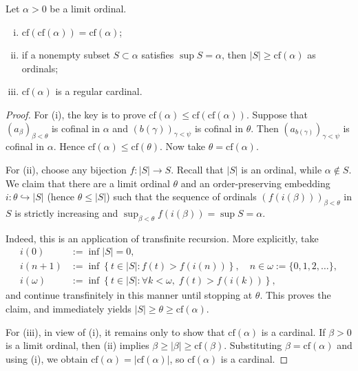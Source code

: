\begin{proposition}\label{prop:cf-generalities}
	Let $\alpha>0$ be a limit ordinal.
	\begin{enumerate}[(i)]
		\item $\mathrm{cf}(\mathrm{cf}(\alpha)) = \mathrm{cf}(\alpha)$;
		\item if a nonempty subset $S\subset\alpha$ satisfies $\sup S=\alpha$, then $|S|\geq\mathrm{cf}(\alpha)$ as ordinals;
		\item $\mathrm{cf}(\alpha)$ is a regular cardinal.
	\end{enumerate}
\end{proposition}
\begin{proof}
	For (i), the key is to prove $\mathrm{cf}(\alpha)\leq\mathrm{cf}(\mathrm{cf}(\alpha))$. Suppose that $(a_\beta)_{\beta<\theta}$ is cofinal in $\alpha$ and $(b(\gamma))_{\gamma<\psi}$ is cofinal in $\theta$. Then $\left(a_{b(\gamma)}\right)_{\gamma<\psi}$ is cofinal in $\alpha$. Hence $\mathrm{cf}(\alpha)\leq\mathrm{cf}(\theta)$. Now take $\theta=\mathrm{cf}(\alpha)$.

	For (ii), choose any bijection $f:|S|\to S$. Recall that $|S|$ is an ordinal, while $\alpha\notin S$. We claim that there are a limit ordinal $\theta$ and an order-preserving embedding $i:\theta\hookrightarrow|S|$ (hence $\theta\leq|S|$) such that the sequence of ordinals $\left(f(i(\beta))\right)_{\beta<\theta}$ in $S$ is strictly increasing and
	$\sup_{\beta<\theta}f(i(\beta))=\sup S=\alpha$.

	Indeed, this is an application of transfinite recursion. More explicitly, take
	\begin{align*}
		i(0) & := \inf |S| = 0, \\
		i(n+1) & := \inf\left\{ t \in |S|: f(t) > f(i(n)) \right\}, \quad n \in \omega := \{0, 1, 2, \ldots\}, \\
		i(\omega) & := \inf\left\{ t \in |S|: \forall k < \omega, \; f(t) > f(i(k)) \right\},
	\end{align*}
	and continue transfinitely in this manner until stopping at $\theta$. This proves the claim, and immediately yields $|S|\geq\theta\geq\mathrm{cf}(\alpha)$.

	For (iii), in view of (i), it remains only to show that $\mathrm{cf}(\alpha)$ is a cardinal. If $\beta>0$ is a limit ordinal, then (ii) implies $\beta\geq|\beta|\geq\mathrm{cf}(\beta)$. Substituting $\beta=\mathrm{cf}(\alpha)$ and using (i), we obtain
	$\mathrm{cf}(\alpha)=|\mathrm{cf}(\alpha)|$, so $\mathrm{cf}(\alpha)$ is a cardinal.
\end{proof}

